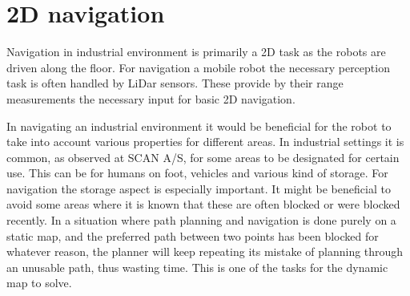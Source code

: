 \section{2D navigation}
Navigation in industrial environment is primarily a 2D task as the robots are driven along the floor. For navigation a mobile robot the necessary perception task is often handled by LiDar sensors. These provide by their range measurements the necessary input for basic 2D navigation. 

In navigating an industrial environment it would be beneficial for the robot to take into account various properties for different areas. In industrial settings it is common, as observed at SCAN A/S, for some areas to be designated for certain use. This can be for humans on foot, vehicles and various kind of storage. For navigation the storage aspect is especially important. It might be beneficial to avoid some areas where it is known that these are often blocked or were blocked recently.
In a situation where path planning and navigation is done purely on a static map, and the preferred path between two points has been blocked for whatever reason, the planner will keep repeating its mistake of planning through an unusable path, thus wasting time. This is one of the tasks for the dynamic map to solve.

